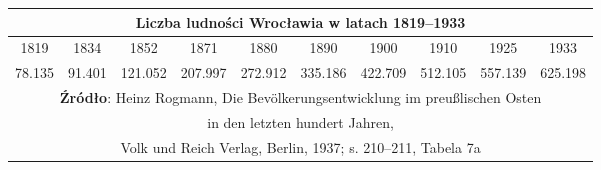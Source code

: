 \documentclass{article}
\begin{document}
\begin{tabular}{|c|c|c|c|c|c|c|c|c|c|} 
\hline
\multicolumn{10}{|c|}{\textbf{Liczba ludności Wrocławia w latach 1819–1933}} \\
\hline
1819 & 1834 & 1852 & 1871 & 1880 & 1890 & 1900 & 1910 & 1925 & 1933 \\ 
\hline
78.135 & 91.401 & 121.052 & 207.997 & 272.912 & 335.186 & 422.709 & 512.105 & 557.139 & 625.198 \\
\hline
\multicolumn{10}{|c|}{\textbf{Źródło}: Heinz Rogmann, Die Bevölkerungsentwicklung im preußlischen Osten}\\
\multicolumn{10}{|c|}{in den letzten hundert Jahren,} \\
\multicolumn{10}{|c|}{Volk und Reich Verlag, Berlin, 1937; s. 210–211, Tabela 7a} \\
\hline
\end{tabular}
\end{document}

